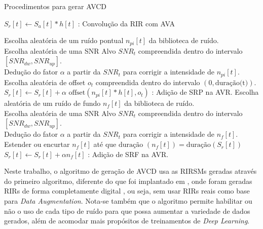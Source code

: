 \begin{algorithm} [H] 
    \caption{Procedimentos para gerar AVCD}
    \label{alg:AVCD-gen}


    $S_r[t] \gets S_a[t] \ast h[t]$ : Convolução da RIR com AVA

    {
        {
            Escolha aleatória de um ruído pontual $n_{pi}[t]$ da biblioteca de ruído. \\
            Escolha aleatória de uma SNR Alvo $SNR_t$ compreendida dentro do intervalo $[SNR_{dw},SNR_{up}]$. \\
            Dedução do fator $\alpha$ a partir da $SNR_t$ para corrigir a intensidade de $n_{pi}[t]$. \\
            Escolha aleatória de offset $o_t$ compreendida dentro do intervalo $(0,\text{duração(t)})$. \\
            $S_r[t] \gets S_r[t] + \alpha \text{ offset}(n_{pi}[t] \ast h[t], o_t)$ : Adição de SRP na AVR.
        }
    }
    {
        Escolha aleatória de um ruído de fundo $n_f[t]$ da biblioteca de ruído. \\
        Escolha aleatória de uma SNR Alvo $SNR_t$ compreendida dentro do intervalo $[SNR_{dw},SNR_{up}]$. \\
        Dedução do fator $\alpha$ a partir da $SNR_t$ para corrigir a intensidade de $n_f[t]$. \\
        Estender ou encurtar $n_f[t]$ até que $\text{duração }(n_f[t]) = \text{duração}(S_r[t])$
        $S_r[t] \gets S_r[t] + \alpha n_f[t]$ : Adição de SRF na AVR.
    }

\end{algorithm}
\pagebreak


Neste trabalho, o algoritmo de geração de AVCD usa as RIRSMs geradas através do primeiro algoritmo, diferente do que foi implantado
em \cite{Speech_Rec}, onde foram geradas RIRs de forma completamente digital \cite{RIR_sim_image}, ou seja, sem usar RIRs reais 
como base para \textit{Data Augmentation}.
Nota-se também que o algoritmo permite habilitar ou não o uso de cada tipo de ruído para que possa aumentar a variedade de dados gerados, além
de acomodar mais propósitos de treinamentos de \textit{Deep Learning}.

